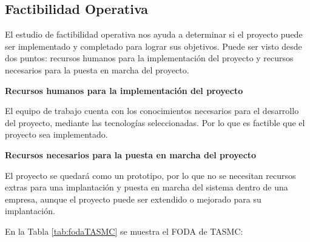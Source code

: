 \subsection{Factibilidad Operativa}

El estudio de factibilidad operativa nos ayuda a determinar si el proyecto puede ser implementado y completado para lograr sus objetivos. Puede ser visto desde dos puntos: recursos humanos para la implementación del proyecto y recursos necesarios para la puesta en marcha del proyecto. 

\textbf{Recursos humanos para la implementación del proyecto}

El equipo de trabajo cuenta con los conocimientos necesarios para el desarrollo del proyecto, mediante las tecnologías seleccionadas. Por lo que es factible que el proyecto sea implementado. 

\textbf{Recursos necesarios para la puesta en marcha del proyecto}

El proyecto se quedará como un prototipo, por lo que no se necesitan recursos extras para una implantación y puesta en marcha del sistema dentro de una empresa, aunque el proyecto puede ser extendido o mejorado para su implantación.

En la Tabla \ref{tab:fodaTASMC} se muestra el FODA de TASMC:

